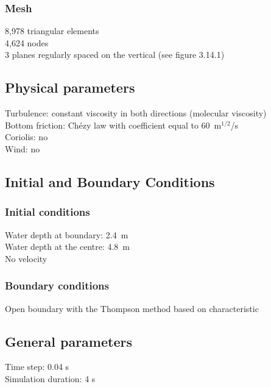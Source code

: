\subsubsection{Mesh}
%
8,978 triangular elements\\
4,624 nodes\\
3 planes regularly spaced on the vertical (see figure 3.14.1)
%
%
%
\subsection{Physical parameters}
%
Turbulence: constant viscosity in both directions (molecular viscosity)\\
Bottom friction: Chézy law with coefficient equal to 60~m$^{1/2}$/s\\
Coriolis: no\\
Wind: no
%
%
%
%
%
%
\subsection{Initial and Boundary Conditions}
%
\subsubsection{Initial conditions}
%
Water depth at boundary: 2.4~m\\
Water depth at the centre: 4.8~m\\
No velocity
%
\subsubsection{Boundary conditions}
%
Open boundary with the Thompson method based on characteristic
%
\subsection{General parameters}
%
Time step: 0.04 s\\
Simulation duration: 4 s
%
%
%
